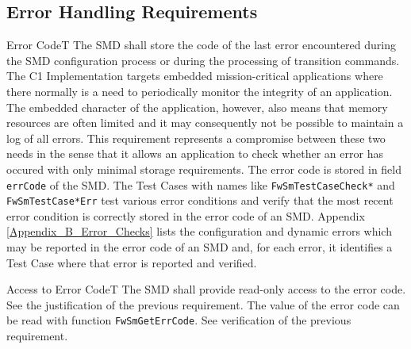 \documentclass[requirements]{../fwprofile}
\begin{document}
\subsection{Error Handling Requirements}\label{req:errorCode}

\begin{fw_req}{Error Code}{T}
{The SMD shall store the code of the last error encountered 
during the SMD configuration process or during the processing of transition commands.}
{The C1 Implementation targets embedded mission-critical 
applications where there normally is a need to periodically monitor the integrity of an
application. 
The embedded character of the application, however, also means that memory resources are 
often limited and it may consequently not be possible to maintain a log of all errors. 
This requirement represents a compromise between these two needs in the sense that it allows 
an application to check whether an error has occured with only minimal storage requirements.}
{The error code is stored in field \texttt{errCode} of the SMD.} 
{The Test Cases with names like \texttt{FwSmTestCaseCheck*} 
and \texttt{FwSmTestCase*Err} test various error conditions and verify that the most 
recent error condition is correctly stored in the error code of an SMD. 
Appendix \ref{Appendix_B_Error_Checks} lists the configuration and dynamic errors which 
may be reported in the error code of an SMD and, for each error, it identifies a Test Case 
where that error is reported and verified.}
\end{fw_req}


\begin{fw_req}{Access to Error Code}{T}
{The SMD shall provide read-only access to the error code.}
{See the justification of the previous requirement.}
{The value of the error code can be read with function \texttt{FwSmGetErrCode}.} 
{See verification of the previous requirement.}
\end{fw_req}
\end{document}
